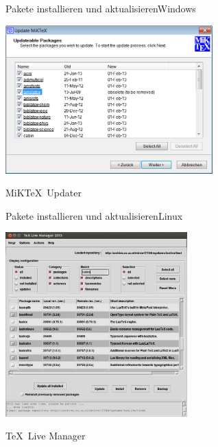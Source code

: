 \begin{Frame}{Pakete installieren und aktualisieren}{Windows}
  \begin{minipage}{\textwidth}\begin{center}
    \includegraphics[width=8cm]{images/miktex-update}

    MiK\TeX\ Updater
  \end{center}\end{minipage}
\end{Frame}

\begin{Frame}{Pakete installieren und aktualisieren}{Linux}
  \begin{minipage}{\textwidth}\begin{center}
    \includegraphics[width=7cm]{images/texlive-update}

    \TeX\ Live Manager
  \end{center}\end{minipage}
\end{Frame}

